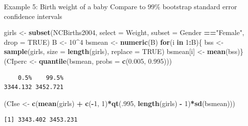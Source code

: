 \documentclass[
  ignorenonframetext,
]{beamer}
\newenvironment{Shaded}{\begin{snugshade}}{\end{snugshade}}
\newcommand{\AttributeTok}[1]{\textcolor[rgb]{0.13,0.29,0.53}{#1}}
\newcommand{\ConstantTok}[1]{\textcolor[rgb]{0.56,0.35,0.01}{#1}}
\newcommand{\ControlFlowTok}[1]{\textcolor[rgb]{0.13,0.29,0.53}{\textbf{#1}}}
\newcommand{\DecValTok}[1]{\textcolor[rgb]{0.00,0.00,0.81}{#1}}
\newcommand{\FloatTok}[1]{\textcolor[rgb]{0.00,0.00,0.81}{#1}}
\newcommand{\FunctionTok}[1]{\textcolor[rgb]{0.13,0.29,0.53}{\textbf{#1}}}
\newcommand{\NormalTok}[1]{#1}
\newcommand{\OtherTok}[1]{\textcolor[rgb]{0.56,0.35,0.01}{#1}}
\newcommand{\SpecialCharTok}[1]{\textcolor[rgb]{0.81,0.36,0.00}{\textbf{#1}}}
\newcommand{\StringTok}[1]{\textcolor[rgb]{0.31,0.60,0.02}{#1}}
\begin{document}
\begin{frame}[fragile]{Example 5: Birth weight of a baby}
\protect\hypertarget{example-5-birth-weight-of-a-baby-6}{}
Compare to \(99\%\) bootstrap standard error confidence intervals
\normalsize

\begin{Shaded}
\begin{Highlighting}[]
\NormalTok{girls }\OtherTok{\textless{}{-}} \FunctionTok{subset}\NormalTok{(NCBirths2004, }\AttributeTok{select =}\NormalTok{ Weight, }
                \AttributeTok{subset =}\NormalTok{ Gender }\SpecialCharTok{==}\StringTok{"Female"}\NormalTok{, }\AttributeTok{drop =} \ConstantTok{TRUE}\NormalTok{)}
\NormalTok{B }\OtherTok{\textless{}{-}} \DecValTok{10}\SpecialCharTok{\^{}}\DecValTok{4}
\NormalTok{bsmean }\OtherTok{\textless{}{-}} \FunctionTok{numeric}\NormalTok{(B)}
\ControlFlowTok{for}\NormalTok{(i }\ControlFlowTok{in} \DecValTok{1}\SpecialCharTok{:}\NormalTok{B)\{}
\NormalTok{  bss }\OtherTok{\textless{}{-}} \FunctionTok{sample}\NormalTok{(girls, }\AttributeTok{size =} \FunctionTok{length}\NormalTok{(girls), }\AttributeTok{replace =} \ConstantTok{TRUE}\NormalTok{)}
\NormalTok{  bsmean[i] }\OtherTok{\textless{}{-}} \FunctionTok{mean}\NormalTok{(bss)\}}
\NormalTok{(CIperc }\OtherTok{\textless{}{-}} \FunctionTok{quantile}\NormalTok{(bsmean, }\AttributeTok{probs =} \FunctionTok{c}\NormalTok{(}\FloatTok{0.005}\NormalTok{, }\FloatTok{0.995}\NormalTok{)))}
\end{Highlighting}
\end{Shaded}

\begin{verbatim}
    0.5%    99.5% 
3344.132 3452.721 
\end{verbatim}

\begin{Shaded}
\begin{Highlighting}[]
\NormalTok{(CIse }\OtherTok{\textless{}{-}} \FunctionTok{c}\NormalTok{(}\FunctionTok{mean}\NormalTok{(girls) }\SpecialCharTok{+} 
    \FunctionTok{c}\NormalTok{(}\SpecialCharTok{{-}}\DecValTok{1}\NormalTok{, }\DecValTok{1}\NormalTok{)}\SpecialCharTok{*}\FunctionTok{qt}\NormalTok{(.}\DecValTok{995}\NormalTok{, }\FunctionTok{length}\NormalTok{(girls) }\SpecialCharTok{{-}} \DecValTok{1}\NormalTok{)}\SpecialCharTok{*}\FunctionTok{sd}\NormalTok{(bsmean)))}
\end{Highlighting}
\end{Shaded}

\begin{verbatim}
[1] 3343.402 3453.231
\end{verbatim}

\normalsize
\end{frame}
\end{document}
